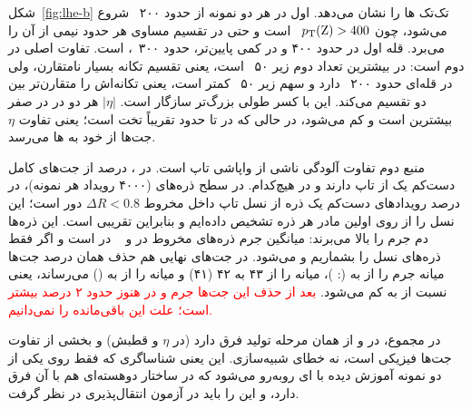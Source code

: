 شکل~\ref{fig:lhe-b} تک‌تک \bq{} ها را نشان می‌دهد. \bq{} اول در هر دو نمونه از حدود ۲۰۰~ شروع می‌شود، چون $p_\mathrm{T}(\mathrm{Z})>400$~ است و حتی در تقسیم مساوی هر \bq{} حدود نیمی از آن را می‌برد. قله \bq{} اول در \Zjet حدود ۴۰۰ و در \ttZ کمی پایین‌تر، حدود ۳۰۰~، است. تفاوت اصلی در \bq{} دوم است: در \Zjet بیشترین تعداد \bq{} دوم زیر ۵۰~ است، یعنی تقسیم تکانه بسیار نامتقارن، ولی در \ttZ قله‌ای حدود ۲۰۰~ دارد و سهم زیر ۵۰~ کمتر است، یعنی \Zbos تکانه‌اش را متقارن‌تر بین دو \bq{} تقسیم می‌کند. این با کسر طولی بزرگ‌تر \ttZ سازگار است. $|\eta|$ هر دو \bq{} در \ttZ در صفر بیشترین است و کم می‌شود، در حالی که در \Zjet تا حدود  تقریباً تخت است؛ یعنی تفاوت $\eta$ جت‌ها از خود \Zbos به \bq{} ها می‌رسد.

منبع دوم تفاوت آلودگی ناشی از واپاشی تاپ است. در \ttZ،  درصد از جت‌های کامل دست‌کم یک \bq{} از تاپ دارند و در \Zjet هیچ‌کدام. در سطح ذره‌های  (۴۰۰۰ رویداد هر نمونه)، در  درصد رویدادهای \ttZ دست‌کم یک ذره از نسل تاپ داخل مخروط $\Delta R<0.8$ دور \Zbos{} است؛ این نسل را از روی اولین مادر هر ذره تشخیص داده‌ایم و بنابراین تقریبی است. این ذره‌ها دم جرم را بالا می‌برند: میانگین جرم ذره‌های مخروط  در \ttZ و ~ در \Zjet است و اگر فقط ذره‌های نسل \Zbos{} را بشماریم  و  می‌شود. در جت‌های نهایی هم حذف همان  درصد جت‌ها میانه جرم \ttZ را از  به  (\Zjet: )، میانه  را از ۴۳ به ۴۲ (۴۱) و میانه  را از  به  () می‌رساند، یعنی نسبت  از  به  کم می‌شود. \textcolor{red}{بعد از حذف این جت‌ها جرم و  در \ttZ هنوز حدود ۲ درصد بیشتر است؛ علت این باقی‌مانده را نمی‌دانیم.}

در مجموع، \Zbos{} در \Zjet و \ttZ از همان مرحله تولید فرق دارد (در $\eta$ و قطبش) و بخشی از تفاوت جت‌ها فیزیکی است، نه خطای شبیه‌سازی. این یعنی شناساگری که فقط روی یکی از دو نمونه آموزش دیده با \Zbos{}ای روبه‌رو می‌شود که در ساختار دو‌هسته‌ای هم با آن فرق دارد، و این را باید در آزمون انتقال‌پذیری در نظر گرفت.
